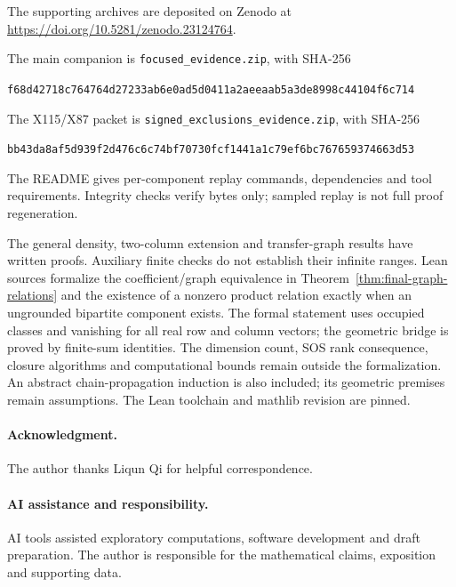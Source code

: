 \documentclass[11pt,a4paper]{article}
\theoremstyle{definition}
\begin{document}
The supporting archives are deposited on Zenodo at
\url{https://doi.org/10.5281/zenodo.23124764}.

The main companion is \texttt{focused\_evidence.zip}, with SHA-256
\begin{center}\footnotesize\texttt{f68d42718c764764d27233ab6e0ad5d0411a2aeeaab5a3de8998c44104f6c714}\end{center}
The X115/X87 packet is
\texttt{signed\_exclusions\_evidence.zip}, with SHA-256
\begin{center}\footnotesize\texttt{bb43da8af5d939f2d476c6c74bf70730fcf1441a1c79ef6bc767659374663d53}\end{center}
The README gives per-component replay commands, dependencies and tool
requirements. Integrity checks verify bytes only; sampled replay is not
full proof regeneration. 

The general density, two-column extension and transfer-graph results have
written proofs. Auxiliary finite checks do not establish their infinite
ranges. Lean sources formalize the coefficient/graph equivalence in
Theorem~\ref{thm:final-graph-relations} and the existence of a nonzero
product relation exactly when an ungrounded bipartite component exists.
The formal statement uses occupied classes and vanishing for all real row and column vectors; the
geometric bridge is proved by finite-sum identities. The dimension count,
SOS rank consequence, closure algorithms and computational bounds remain
outside the formalization. An abstract chain-propagation induction is
also included; its geometric premises remain assumptions.
The Lean toolchain and mathlib revision are pinned.

\paragraph{Acknowledgment.}
The author thanks Liqun Qi for helpful correspondence.

\paragraph{AI assistance and responsibility.}
AI tools assisted exploratory computations, software development and
draft preparation. The author is responsible for the mathematical
claims, exposition and supporting data.

\begingroup
\setlength{\bibsep}{2pt}
\renewcommand{\bibfont}{\small}
\raggedright


\endgroup
\end{document}

